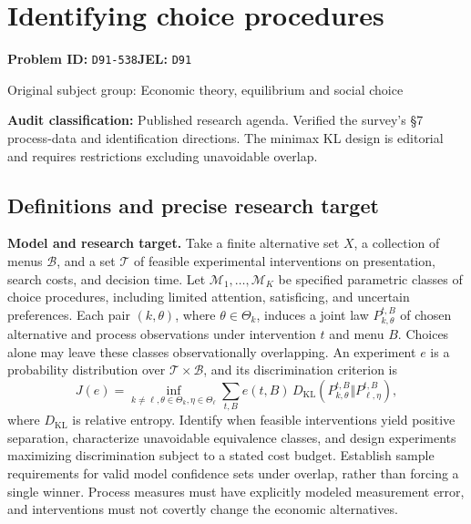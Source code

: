 \documentclass[11pt,a4paper]{article}
\begin{document}
\section*{Identifying choice procedures}
\textbf{Problem ID:} \texttt{D91-538}\quad \textbf{JEL:} \texttt{D91}\par
\label{problem:OP-0274}
{\sffamily\small\color{muted}Original subject group: Economic theory, equilibrium and social choice\par}
\label{definitions:problem:30007555}
\textbf{Audit classification:} Published research agenda. Verified the survey’s §7 process-data and identification directions. The minimax KL design is editorial and requires restrictions excluding unavoidable overlap.
\subsection*{Definitions and precise research target}
\textbf{Model and research target.} Take a finite alternative set \(X\), a collection of menus \(\mathcal B\), and a set \(\mathcal T\) of feasible experimental interventions on presentation, search costs, and decision time. Let \(\mathcal M_1,\ldots,\mathcal M_K\) be specified parametric classes of choice procedures, including limited attention, satisficing, and uncertain preferences. Each pair \((k,\theta)\), where \(\theta\in\Theta_k\), induces a joint law \(P_{k,\theta}^{t,B}\) of chosen alternative and process observations under intervention \(t\) and menu \(B\). Choices alone may leave these classes observationally overlapping. An experiment \(e\) is a probability distribution over \(\mathcal T\times\mathcal B\), and its discrimination criterion is
\[
 J(e)=\inf_{k\ne\ell,\theta\in\Theta_k,\eta\in\Theta_\ell}
 \sum_{t,B}e(t,B)\,D_{\mathrm{KL}}(P_{k,\theta}^{t,B}\Vert P_{\ell,\eta}^{t,B}),
\]
where \(D_{\mathrm{KL}}\) is relative entropy. Identify when feasible interventions yield positive separation, characterize unavoidable equivalence classes, and design experiments maximizing discrimination subject to a stated cost budget. Establish sample requirements for valid model confidence sets under overlap, rather than forcing a single winner. Process measures must have explicitly modeled measurement error, and interventions must not covertly change the economic alternatives.
\end{document}
